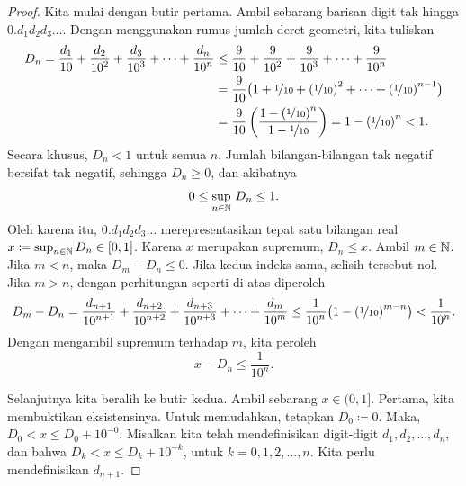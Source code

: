 \begin{proof}
Kita mulai dengan butir pertama. Ambil sebarang barisan digit
tak hingga $0.d_1d_2d_3\ldots$. Dengan menggunakan rumus jumlah deret geometri, kita tuliskan
\begin{equation*}
\begin{split}
D_n =
\frac{d_1}{10} +
\frac{d_2}{{10}^2} +
\frac{d_3}{{10}^3} +
\cdots +
\frac{d_n}{{10}^n}
& \leq
\frac{9}{10} +
\frac{9}{{10}^2} +
\frac{9}{{10}^3} +
\cdots +
\frac{9}{{10}^n}
\\
& =
\frac{9}{10}
\bigl( 1 + \nicefrac{1}{10} +
{(\nicefrac{1}{10})}^2 + \cdots +
{(\nicefrac{1}{10})}^{n-1} \bigr)
\\
& =
\frac{9}{10}
\left(
\frac{1-{(\nicefrac{1}{10})}^{n}}{1-\nicefrac{1}{10}}
\right)
= 1-{(\nicefrac{1}{10})}^{n}
< 1 .
\end{split}
\end{equation*}
Secara khusus, $D_n < 1$ untuk semua $n$. Jumlah bilangan-bilangan tak negatif
bersifat tak negatif, sehingga $D_n \geq 0$, dan akibatnya
\begin{equation*}
0 \leq \sup_{n\in {\mathbb{N}}} \, D_n \leq 1 .
\end{equation*}
Oleh karena itu, $0.d_1d_2d_3\ldots$ merepresentasikan tepat satu bilangan real $x \coloneqq \sup_{n\in
{\mathbb{N}}} D_n \in [0,1]$.
Karena $x$ merupakan supremum, $D_n \leq x$.
Ambil $m \in {\mathbb{N}}$. Jika $m < n$, maka $D_m - D_n \leq 0$. Jika kedua indeks sama, selisih tersebut nol. Jika $m > n$, dengan
perhitungan seperti di atas diperoleh
\begin{equation*}
D_m - D_n
=
\frac{d_{n+1}}{{10}^{n+1}} +
\frac{d_{n+2}}{{10}^{n+2}} +
\frac{d_{n+3}}{{10}^{n+3}} +
\cdots +
\frac{d_{m}}{{10}^m}
\leq
\frac{1}{{10}^{n}}
\bigl(
1-{(\nicefrac{1}{10})}^{m-n}
\bigr)
<
\frac{1}{{10}^{n}} .
\end{equation*}
Dengan mengambil supremum terhadap $m$, kita peroleh
\begin{equation*}
x - D_n
\leq
\frac{1}{{10}^{n}} .
\end{equation*}

Selanjutnya kita beralih ke
butir kedua. Ambil sebarang $x \in (0,1]$.
Pertama, kita membuktikan eksistensinya.
Untuk memudahkan, tetapkan $D_0 \coloneqq 0$.
Maka,
$D_0 < x \leq D_0 + {10}^{-0}$.
Misalkan kita telah mendefinisikan digit-digit $d_1,d_2,\ldots,d_n$,
dan bahwa
$D_k < x \leq D_k + {10}^{-k}$, untuk $k=0,1,2,\ldots,n$. Kita perlu mendefinisikan $d_{n+1}$.


\end{proof}
